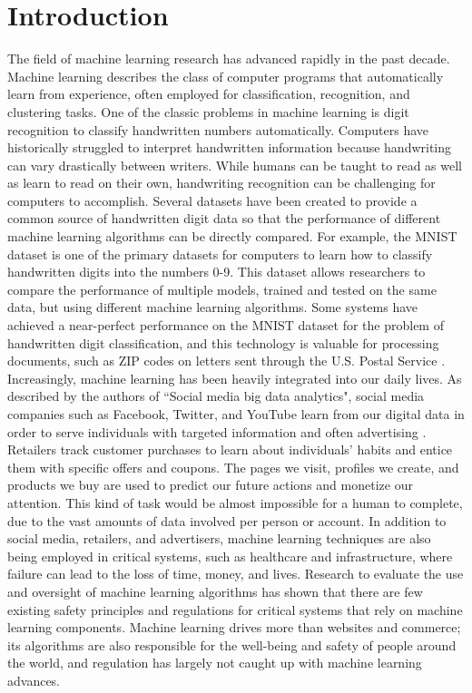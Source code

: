 \chapter{Introduction}

The field of machine learning research has advanced rapidly in the past decade. Machine learning describes the class of computer programs that automatically learn from experience, often employed for classification, recognition, and clustering tasks. One of the classic problems in machine learning is digit recognition to classify handwritten numbers automatically. Computers have historically struggled to interpret handwritten information because handwriting can vary drastically between writers. While humans can be taught to read as well as learn to read on their own, handwriting recognition can be challenging for computers to accomplish. Several datasets have been created to provide a common source of handwritten digit data so that the performance of different machine learning algorithms can be directly compared. For example, the MNIST dataset \cite{LBBH98} is one of the primary datasets for computers to learn how to classify handwritten digits into the numbers 0-9. This dataset allows researchers to compare the performance of multiple models, trained and tested on the same data, but using different machine learning algorithms. Some systems have achieved a near-perfect performance on the MNIST dataset for the problem of handwritten digit classification, and this technology is valuable for processing documents, such as ZIP codes on letters sent through the U.S. Postal Service \cite{MKB17}.
\\Increasingly, machine learning has been heavily integrated into our daily lives. As described by the authors of ``Social media big data analytics", social media companies such as Facebook, Twitter, and YouTube learn from our digital data in order to serve individuals with targeted information and often advertising \cite{GHHA19}. Retailers track customer purchases to learn about individuals' habits and entice them with specific offers and coupons. The pages we visit, profiles we create, and products we buy are used to predict our future actions and monetize our attention. This kind of task would be almost impossible for a human to complete, due to the vast amounts of data involved per person or account. In addition to social media, retailers, and advertisers, machine learning techniques are also being employed in critical systems, such as healthcare and infrastructure, where failure can lead to the loss of time, money, and lives. Research to evaluate the use and oversight of machine learning algorithms \cite{Var16} has shown that there are few existing safety principles and regulations for critical systems that rely on machine learning components. Machine learning drives more than websites and commerce; its algorithms are also responsible for the well-being and safety of people around the world, and regulation has largely not caught up with machine learning advances.
